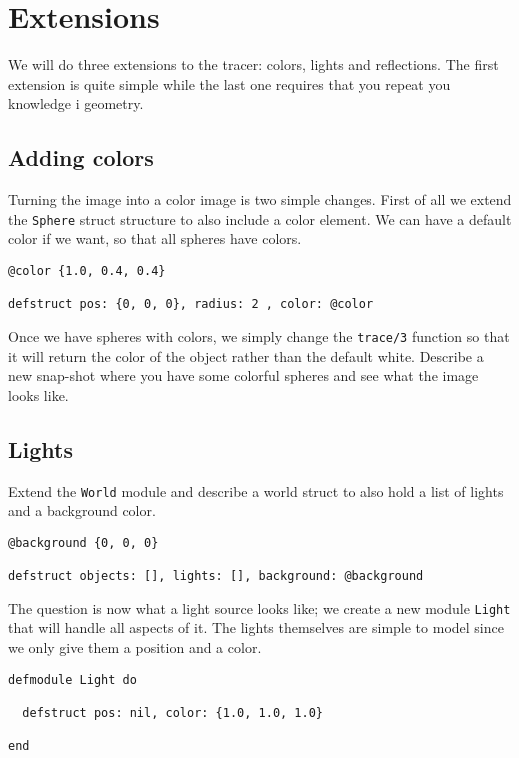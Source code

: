 \documentclass[a4paper,11pt]{article}
\begin{document}
\section{Extensions}

We will do three extensions to the tracer: colors, lights and
reflections. The first extension is quite simple while the last one
requires that you repeat you knowledge i geometry. 

\subsection*{Adding colors}

Turning the image into a color image is two simple changes. First of
all we extend the {\tt Sphere} struct structure to also include a
color element. We can have a default color if we want, so that all
spheres have colors.

\begin{verbatim}
@color {1.0, 0.4, 0.4}

defstruct pos: {0, 0, 0}, radius: 2 , color: @color

\end{verbatim}

Once we have spheres with colors, we simply change the {\tt trace/3}
function so that it will return the color of the object rather than
the default white. Describe a new snap-shot where you have some
colorful spheres and see what the image looks like.

\subsection{Lights}

Extend the {\tt World} module and describe a world struct to also hold
a list of lights and a background color.

\begin{verbatim}
@background {0, 0, 0}

defstruct objects: [], lights: [], background: @background
\end{verbatim}

The question is now what a light source looks like; we create a new
module {\tt Light} that will handle all aspects of it. The lights
themselves are simple to model since we only give them a position and a
color.

\begin{verbatim}
defmodule Light do

  defstruct pos: nil, color: {1.0, 1.0, 1.0}

end
\end{verbatim}
\end{document}
